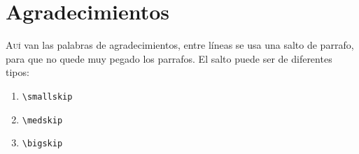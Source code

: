 \chapter*{Agradecimientos}
\pagestyle{especial}
\pagestyle{empty}
{}

\lettrine[lraise=0, lines=4, loversize=0]{\textcolor{azulF}{A}}{uí} van las palabras de agradecimientos, entre 
líneas se usa una salto de parrafo, para que no quede muy pegado los parrafos. El salto puede ser de diferentes tipos:
\begin{enumerate}
     \item \verb|\smallskip|
     \item \verb|\medskip|
     \item \verb|\bigskip|
\end{enumerate}


{}%
\vspace{-.3cm}
{}%
